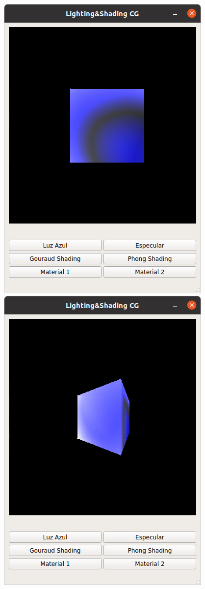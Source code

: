 \documentclass[12pt]{article}
\begin{document}
\begin{figure}[H]
\centering
\includegraphics[scale=0.5]{images/ej4.png}
\includegraphics[scale=0.5]{images/ej5.png}

\end{figure}
\end{document}
